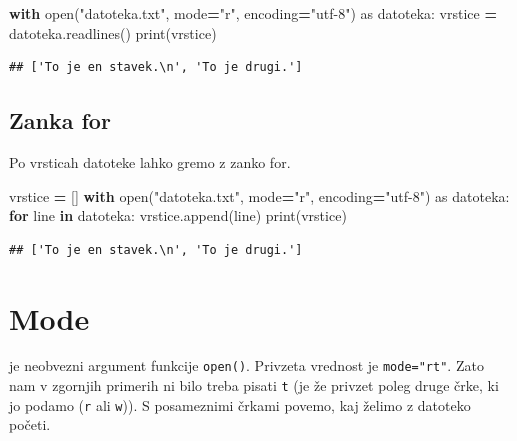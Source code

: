 \documentclass[
]{report}
\newenvironment{Shaded}{\begin{snugshade}}{\end{snugshade}}
\newcommand{\BuiltInTok}[1]{#1}
\newcommand{\ControlFlowTok}[1]{\textcolor[rgb]{0.13,0.29,0.53}{\textbf{#1}}}
\newcommand{\ImportTok}[1]{#1}
\newcommand{\KeywordTok}[1]{\textcolor[rgb]{0.13,0.29,0.53}{\textbf{#1}}}
\newcommand{\NormalTok}[1]{#1}
\newcommand{\OperatorTok}[1]{\textcolor[rgb]{0.81,0.36,0.00}{\textbf{#1}}}
\newcommand{\StringTok}[1]{\textcolor[rgb]{0.31,0.60,0.02}{#1}}
\begin{document}
\begin{Shaded}
\begin{Highlighting}[]
\ControlFlowTok{with} \BuiltInTok{open}\NormalTok{(}\StringTok{"datoteka.txt"}\NormalTok{, mode}\OperatorTok{=}\StringTok{"r"}\NormalTok{, encoding}\OperatorTok{=}\StringTok{"utf{-}8"}\NormalTok{) }\ImportTok{as}\NormalTok{ datoteka:}
\NormalTok{    vrstice }\OperatorTok{=}\NormalTok{ datoteka.readlines()}
\BuiltInTok{print}\NormalTok{(vrstice)}
\end{Highlighting}
\end{Shaded}

\begin{verbatim}
## ['To je en stavek.\n', 'To je drugi.']
\end{verbatim}

\hypertarget{zanka-for-1}{%
\subsection{Zanka for}\label{zanka-for-1}}

Po vrsticah datoteke lahko gremo z zanko for.

\begin{Shaded}
\begin{Highlighting}[]
\NormalTok{vrstice }\OperatorTok{=}\NormalTok{ []}
\ControlFlowTok{with} \BuiltInTok{open}\NormalTok{(}\StringTok{"datoteka.txt"}\NormalTok{, mode}\OperatorTok{=}\StringTok{"r"}\NormalTok{, encoding}\OperatorTok{=}\StringTok{"utf{-}8"}\NormalTok{) }\ImportTok{as}\NormalTok{ datoteka:}
    \ControlFlowTok{for}\NormalTok{ line }\KeywordTok{in}\NormalTok{ datoteka:}
\NormalTok{        vrstice.append(line)}
\BuiltInTok{print}\NormalTok{(vrstice)}
\end{Highlighting}
\end{Shaded}

\begin{verbatim}
## ['To je en stavek.\n', 'To je drugi.']
\end{verbatim}

\hypertarget{mode}{%
\section{Mode}\label{mode}}

je neobvezni argument funkcije \texttt{open()}. Privzeta vrednost je \texttt{mode="rt"}. Zato
nam v zgornjih primerih ni bilo treba pisati \texttt{t} (je že privzet poleg druge
črke, ki jo podamo (\texttt{r} ali \texttt{w})). S posameznimi črkami povemo, kaj želimo z
datoteko početi.
\end{document}
